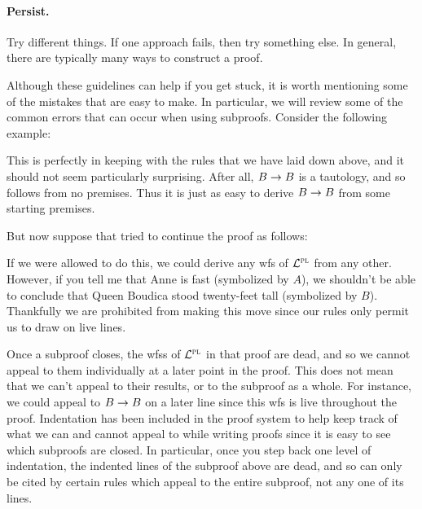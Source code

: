 \paragraph{Persist.}
Try different things.
If one approach fails, then try something else.
In general, there are typically many ways to construct a proof.




Although these guidelines can help if you get stuck, it is worth mentioning some of the mistakes that are easy to make.
In particular, we will review some of the common errors that can occur when using subproofs.
Consider the following example:
\begin{fitchproof}
	 \pr{}
	\open
		 
		 
	\close
\end{fitchproof}
This is perfectly in keeping with the rules that we have laid down above, and it should not seem particularly surprising.
After all, $B \rightarrow B$ is a tautology, and so follows from no premises.
Thus it is just as easy to derive $B \rightarrow B$ from some starting premises.

But now suppose that tried to continue the proof as follows:
\begin{fitchproof}
	 \pr{}
	\open
		 
		 
	\close
	 
\end{fitchproof}
If we were allowed to do this, we could derive any wfs of $\mathcal{L}^{\textsc{pl}}$ from any other.
However, if you tell me that Anne is fast (symbolized by $A$), we shouldn't be able to conclude that Queen Boudica stood twenty-feet tall (symbolized by $B$).
Thankfully we are prohibited from making this move since our rules only permit us to draw on live lines.

Once a subproof closes, the wfss of $\mathcal{L}^{\textsc{pl}}$ in that proof are dead, and so we cannot appeal to them individually at a later point in the proof.
This does not mean that we can't appeal to their results, or to the subproof as a whole.
For instance, we could appeal to $B \rightarrow B$ on a later line since this wfs is live throughout the proof. 
Indentation has been included in the proof system to help keep track of what we can and cannot appeal to while writing proofs since it is easy to see which subproofs are closed.
In particular, once you step back one level of indentation, the indented lines of the subproof above are dead, and so can only be cited by certain rules which appeal to the entire subproof, not any one of its lines.

